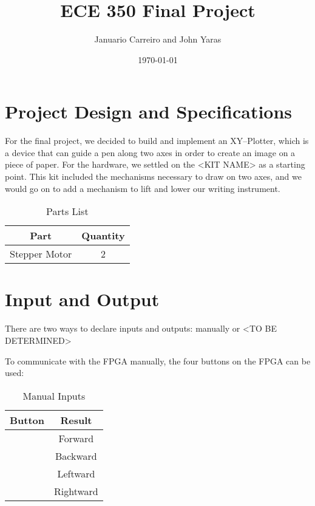 \documentclass[12pt]{article}
\begin{document}
\title{ECE 350 Final Project}
\author{Januario Carreiro and John Yaras}
\date{\today}

\maketitle

\thispagestyle{fancy}

\newpage

\section{Project Design and Specifications}
For the final project, we decided to build and implement an XY--Plotter, which is a device that can guide a pen along two axes in order to create an image on a piece of paper. For the hardware, we settled on the <KIT NAME> as a starting point. This kit included the mechanisms necessary to draw on two axes, and we would go on to add a mechanism to lift and lower our writing instrument.

\begin{table}[ht!]
\centering
\begin{tabular}{|c|c|} \hline
Part & Quantity \\ \hline \hline
Stepper Motor & 2 \\ \hline
\end{tabular}
\caption{Parts List}
\end{table}


\section{Input and Output}
There are two ways to declare inputs and outputs: manually or <TO BE DETERMINED> %

To communicate with the FPGA manually, the four buttons on the FPGA can be used:

\begin{table}[ht!]
\centering
\begin{tabular}{|c|c|} \hline
Button & Result \\ \hline \hline
 & Forward \\ \hline
 & Backward \\ \hline
 & Leftward \\ \hline
 & Rightward \\ \hline
\end{tabular}
\caption{Manual Inputs}
\end{table}
\end{document}
